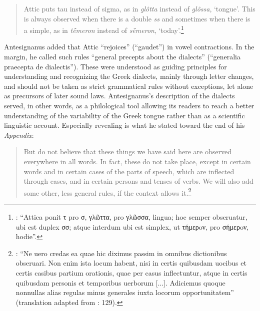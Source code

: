 \begin{quote}
Attic puts tau instead of sigma, as in \textit{glôtta} instead of \textit{glôssa}, `tongue'. This is always observed when there is a double \textit{ss} and sometimes when there is a simple, as in \textit{tḗmeron} instead of \textit{sḗmeron}, `today'.\footnote{{\citet[13]{Antesignanus1554}: “Attica ponit τ pro σ, γλῶττα, pro γλῶσσα, lingua; hoc semper obseruatur, ubi est duplex σσ; atque interdum ubi est simplex, ut τήμερoν, pro σήμερoν, hodie”.}}
\end{quote}

Antesignanus added that Attic “rejoices” (“gaudet”) in vowel contractions. In the margin, he called such rules “general precepts about the dialects” (“generalia praecepta de dialectis”). These were understood as guiding principles for understanding and recognizing the Greek dialects, mainly through letter changes, and should not be taken as strict grammatical rules without exceptions, let alone as precursors of later sound laws. Antesignanus’s description of the dialects served, in other words, as a philological tool allowing its readers to reach a better understanding of the variability of the Greek tongue rather than as a scientific linguistic account. Especially revealing is what he stated toward the end of his \textit{Appendix}:

\begin{quote}
But do not believe that these things we have said here are observed everywhere in all words. In fact, these do not take place, except in certain words and in certain cases of the parts of speech, which are inflected through cases, and in certain persons and tenses of verbs. We will also add some other, less general rules, if the context allows it.\footnote{{\citet[15]{Antesignanus1554}: “Ne uero credas ea quae hic diximus passim in omnibus dictionibus obseruari. Non enim ista locum habent, nisi in certis quibusdam uocibus et certis casibus partium orationis, quae per casus inflectuntur, atque in certis quibusdam personis et temporibus uerborum [...]. Adiciemus quoque nonnullas alias regulas minus generales iuxta locorum opportunitatem” (translation adapted from \citealt{VanRooy2016c}: 129).}}
\end{quote}

